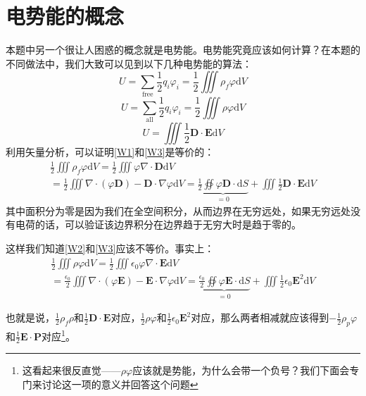 \documentclass{ctexart}
\begin{document}
	\section{电势能的概念}
	
	本题中另一个很让人困惑的概念就是电势能。电势能究竟应该如何计算？在本题的不同做法中，我们大致可以见到以下几种电势能的算法：
	\begin{equation}\label{W1}
	U=\sum_{\text{free}}\frac{1}{2}q_i\varphi_i=\frac{1}{2}\iiint \rho_f\varphi\mathrm dV
	\end{equation}
	\begin{equation}\label{W2}
	U=\sum_{\text{all}}\frac{1}{2}q_i\varphi_i=\frac{1}{2}\iiint \rho\varphi\mathrm dV
	\end{equation}
	\begin{equation}\label{W3}
	U=\iiint \frac{1}{2}\mathbf D\cdot\mathbf E\mathrm dV
	\end{equation}
	利用矢量分析，可以证明\eqref{W1}和\eqref{W3}是等价的：
	\begin{multline}
	\frac{1}{2}\iiint \rho_f\varphi\mathrm dV=\frac{1}{2}\iiint \varphi\nabla\cdot\mathbf D\mathrm dV\\=\frac{1}{2}\iiint \nabla\cdot(\varphi \mathbf D)-\mathbf D\cdot\nabla\varphi\mathrm dV=\underbrace{\frac{1}{2}\oiint \varphi\mathbf D\cdot\mathrm dS}_{=0}+\iiint\frac{1}{2}\mathbf D\cdot\mathbf E\mathrm dV
	\end{multline}
	其中面积分为零是因为我们在全空间积分，从而边界在无穷远处，如果无穷远处没有电荷的话，可以验证该边界积分在边界趋于无穷大时是趋于零的。
	
	这样我们知道\eqref{W2}和\eqref{W3}应该不等价。事实上：
	\begin{multline}
	\frac{1}{2}\iiint \rho\varphi\mathrm dV=\frac{1}{2}\iiint \epsilon_0\varphi\nabla\cdot\mathbf E\mathrm dV\\=\frac{\epsilon_0}{2}\iiint \nabla\cdot(\varphi \mathbf E)-\mathbf E\cdot\nabla\varphi\mathrm dV=\underbrace{\frac{\epsilon_0}{2}\oiint \varphi\mathbf E\cdot\mathrm dS}_{=0}+\iiint\frac{1}{2}\epsilon_0\mathbf E^2\mathrm dV
	\end{multline}
	
	也就是说，$\frac{1}{2}\rho_f\rho$和$\frac{1}{2}\mathbf D\cdot\mathbf E$对应，$\frac{1}{2}\rho\varphi$和$\frac{1}{2}\epsilon_0\mathbf E^2$对应，那么两者相减就应该得到$-\frac{1}{2}\rho_p\varphi$和$\frac{1}{2}\mathbf E\cdot\mathbf P$对应\footnote{这看起来很反直觉——$\rho\varphi$应该就是势能，为什么会带一个负号？我们下面会专门来讨论这一项的意义并回答这个问题}。
	
\end{document}
